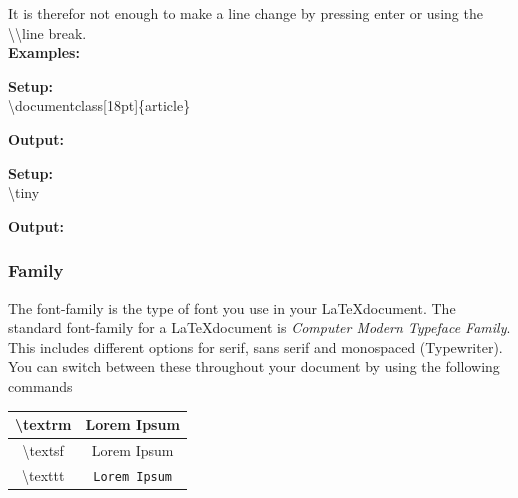 \documentclass{article}
\newcommand{\jbs}[1]{\textbackslash{}#1} %
\begin{document}
It is therefor not enough to make a line change by pressing enter or using the \textbackslash\textbackslash line break. \\

{\large\textbf{Examples:}} \\
\begin{multicols}{2}
\noindent  %
\vspace{0.5em}  %
\textbf{Setup:} \\
\jbs{documentclass[18pt]\{article\}}

\vspace{1.5em}  %
\textbf{Output:} \\
\end{multicols} %

\begin{multicols}{2}
\noindent

\vspace{0.5em}
\textbf{Setup:} \\
\jbs{tiny}

\vspace{0.5em}
\textbf{Output:} \\
\end{multicols} %


\subsubsection{Family}\label{subsubsec:text_family}
The font-family is the type of font you use in your \LaTeX document. The standard font-family for a \LaTeX document is \textit{Computer Modern Typeface Family}. 
This includes different options for serif, sans serif and monospaced (Typewriter). You can switch between these throughout your document by using the following commands

\begin{table}[H]
    \centering
    \begin{tabular}{|c|c|}
        \hline
        \jbs{textrm} & \textrm{Lorem Ipsum} \\ \hline
        \jbs{textsf} & \textsf{Lorem Ipsum} \\ \hline
        \jbs{texttt} & \texttt{Lorem Ipsum} \\ \hline
    \end{tabular}
    \label{tab:font_family}
\end{table} %
\end{document}
